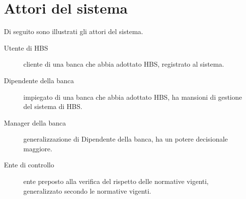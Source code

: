 \section{Attori del sistema}

Di seguito sono illustrati gli attori del sistema.

\begin{description}
	\item[Utente di HBS]
		cliente di una banca che abbia adottato HBS, registrato al sistema.

	\item[Dipendente della banca]
		impiegato di una banca che abbia adottato HBS, ha mansioni di gestione del sistema di HBS.

	\item[Manager della banca]
		generalizzazione di Dipendente della banca, ha un potere decisionale maggiore.

	\item[Ente di controllo]
		ente preposto alla verifica del rispetto delle normative vigenti, generalizzato secondo le normative vigenti.
\end{description}

